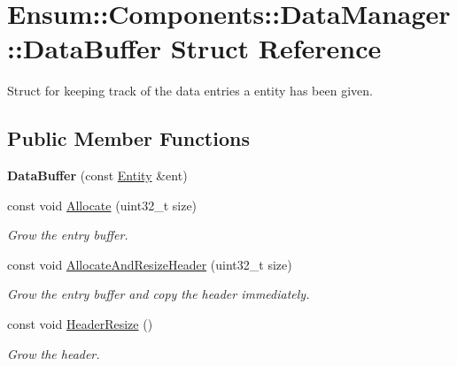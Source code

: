 \hypertarget{struct_ensum_1_1_components_1_1_data_manager_1_1_data_buffer}{}\section{Ensum\+:\+:Components\+:\+:Data\+Manager\+:\+:Data\+Buffer Struct Reference}
\label{struct_ensum_1_1_components_1_1_data_manager_1_1_data_buffer}


Struct for keeping track of the data entries a entity has been given.  


\subsection*{Public Member Functions}
\begin{DoxyCompactItemize}
\item 
{\bfseries Data\+Buffer} (const \hyperlink{struct_ensum_1_1_components_1_1_entity}{Entity} \&ent)\hypertarget{struct_ensum_1_1_components_1_1_data_manager_1_1_data_buffer_a1dcb14cba81346865107759292b46d2c}{}\label{struct_ensum_1_1_components_1_1_data_manager_1_1_data_buffer_a1dcb14cba81346865107759292b46d2c}

\item 
const void \hyperlink{struct_ensum_1_1_components_1_1_data_manager_1_1_data_buffer_abbdb72eacb423808f312810d5ce4556f}{Allocate} (uint32\+\_\+t size)\hypertarget{struct_ensum_1_1_components_1_1_data_manager_1_1_data_buffer_abbdb72eacb423808f312810d5ce4556f}{}\label{struct_ensum_1_1_components_1_1_data_manager_1_1_data_buffer_abbdb72eacb423808f312810d5ce4556f}

\begin{DoxyCompactList}\small\item\em Grow the entry buffer. \end{DoxyCompactList}\item 
const void \hyperlink{struct_ensum_1_1_components_1_1_data_manager_1_1_data_buffer_a0a35fa29a95fa628d4323d130c636da8}{Allocate\+And\+Resize\+Header} (uint32\+\_\+t size)\hypertarget{struct_ensum_1_1_components_1_1_data_manager_1_1_data_buffer_a0a35fa29a95fa628d4323d130c636da8}{}\label{struct_ensum_1_1_components_1_1_data_manager_1_1_data_buffer_a0a35fa29a95fa628d4323d130c636da8}

\begin{DoxyCompactList}\small\item\em Grow the entry buffer and copy the header immediately. \end{DoxyCompactList}\item 
const void \hyperlink{struct_ensum_1_1_components_1_1_data_manager_1_1_data_buffer_a1ec69ae3f18745283e3190ea663a17a2}{Header\+Resize} ()\hypertarget{struct_ensum_1_1_components_1_1_data_manager_1_1_data_buffer_a1ec69ae3f18745283e3190ea663a17a2}{}\label{struct_ensum_1_1_components_1_1_data_manager_1_1_data_buffer_a1ec69ae3f18745283e3190ea663a17a2}

\begin{DoxyCompactList}\small\item\em Grow the header. \end{DoxyCompactList}\end{DoxyCompactItemize}
